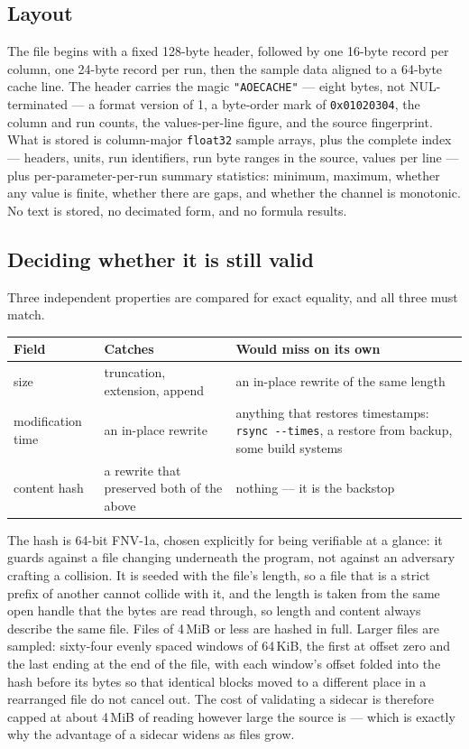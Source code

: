 \documentclass[11pt,a4paper,oneside]{report}
\newcommand{\code}[1]{\texttt{#1}}
\begin{document}
\subsection{Layout}

The file begins with a fixed 128-byte header, followed by one 16-byte record per
column, one 24-byte record per run, then the sample data aligned to a 64-byte
cache line. The header carries the magic \code{"AOECACHE"} --- eight bytes, not
NUL-terminated --- a format version of 1, a byte-order mark of
\code{0x01020304}, the column and run counts, the values-per-line figure, and the
source fingerprint. What is stored is column-major \code{float32} sample arrays,
plus the complete index --- headers, units, run identifiers, run byte ranges in
the source, values per line --- plus per-parameter-per-run summary statistics:
minimum, maximum, whether any value is finite, whether there are gaps, and
whether the channel is monotonic. No text is stored, no decimated form, and no
formula results.

\subsection{Deciding whether it is still valid}

Three independent properties are compared for exact equality, and all three must
match.

\begin{center}
\small
\begin{tabular}{@{}p{}p{}p{}@{}}
\toprule
\textbf{Field} & \textbf{Catches} & \textbf{Would miss on its own} \\
\midrule
size & truncation, extension, append & an in-place rewrite of the same length \\
modification time & an in-place rewrite & anything that restores timestamps: \code{rsync -{}-times}, a restore from backup, some build systems \\
content hash & a rewrite that preserved both of the above & nothing --- it is the backstop \\
\bottomrule
\end{tabular}
\end{center}

The hash is 64-bit FNV-1a, chosen explicitly for being verifiable at a glance: it
guards against a file changing underneath the program, not against an adversary
crafting a collision. It is seeded with the file's length, so a file that is a
strict prefix of another cannot collide with it, and the length is taken from the
same open handle that the bytes are read through, so length and content always
describe the same file. Files of 4\,MiB or less are hashed in full. Larger files
are sampled: sixty-four evenly spaced windows of 64\,KiB, the first at offset zero
and the last ending at the end of the file, with each window's offset folded into
the hash before its bytes so that identical blocks moved to a different place in
a rearranged file do not cancel out. The cost of validating a sidecar is
therefore capped at about 4\,MiB of reading however large the source is --- which
is exactly why the advantage of a sidecar widens as files grow.
\end{document}
